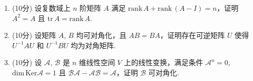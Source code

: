 \documentclass[11pt, a4paper]{article}
\begin{document}
\begin{enumerate}
\begin{enumerate}[label=(\arabic*)]
            \item 将 $V$ 分解为 $\mathcal{A}$ 的根子空间 $V_1$, $V_2$ 的直和，求出 $V_1$, $V_2$ 的维数;
            \item 求 $\mathcal{A}$ 的最小多项式;
            \item 求一个 $2$ 次多项式 $h(x)$，使得线性变换 $\mathcal{B}=h(\mathcal{A})$ 可以对角化且 $\mathcal{A}-\mathcal{B}$ 是 $V$ 上的幂零变换.
        \end{enumerate}
    \item (10分) 设复数域上 $n$ 阶矩阵 $A$ 满足 $\mathrm{rank}\,A+\mathrm{rank}\,(A-I)=n$，证明 $A^2=A$ 且 $\mathrm{tr}\,A=\mathrm{rank}\,A$.
    \item (10分) 设矩阵 $A$, $B$ 均可对角化，且 $AB=BA$，证明存在可逆矩阵 $U$ 使得 $U^{-1}AU$ 和 $U^{-1}BU$ 均为对角矩阵.
    \item (10分) 设 $\mathcal{A}$, $\mathcal{B}$ 是 $n$ 维线性空间 $V$ 上的线性变换，满足条件 $\mathcal{A}^n=0$, $\mathrm{dim}\,\mathrm{Ker}\mathcal{A}=1$ 且 $\mathcal{B}\mathcal{A}-\mathcal{A}\mathcal{B}=\mathcal{A}$，证明 $\mathcal{B}$ 可对角化.
 \end{enumerate}
\end{document}
